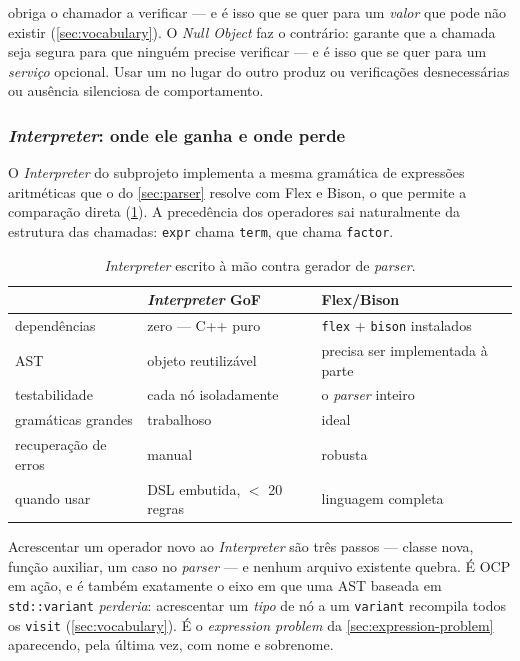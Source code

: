 \begin{regra}
 obriga o chamador a verificar --- e é isso que se quer
para um \emph{valor} que pode não existir (\cref{sec:vocabulary}). O \emph{Null
Object} faz o contrário: garante que a chamada seja segura para que ninguém
precise verificar --- e é isso que se quer para um \emph{serviço} opcional. Usar
um no lugar do outro produz ou verificações desnecessárias ou ausência
silenciosa de comportamento.
\end{regra}

\subsubsection{\emph{Interpreter}: onde ele ganha e onde perde}

O \emph{Interpreter} do subprojeto implementa a mesma gramática de expressões
aritméticas que o  do \cref{sec:parser} resolve com Flex e
Bison, o que permite a comparação direta (\cref{tab:interpreter-bison}). A
precedência dos operadores sai naturalmente da estrutura das chamadas:
\texttt{expr} chama \texttt{term}, que chama \texttt{factor}.

\begin{table}[htbp]
\centering
\caption{\emph{Interpreter} escrito à mão contra gerador de \emph{parser}.}
\label{tab:interpreter-bison}
\footnotesize
\begin{tabular}{@{}lll@{}}
\toprule
 & \textbf{\emph{Interpreter} GoF} & \textbf{Flex/Bison} \\
\midrule
dependências           & zero --- C++ puro      & \texttt{flex} + \texttt{bison} instalados \\
AST                    & objeto reutilizável    & precisa ser implementada à parte \\
testabilidade          & cada nó isoladamente   & o \emph{parser} inteiro \\
gramáticas grandes     & trabalhoso             & ideal \\
recuperação de erros   & manual                 & robusta \\
quando usar            & DSL embutida, $<$ 20 regras & linguagem completa \\
\bottomrule
\end{tabular}
\end{table}

Acrescentar um operador novo ao \emph{Interpreter} são três passos --- classe
nova, função auxiliar, um caso no \emph{parser} --- e nenhum arquivo existente
quebra. É OCP em ação, e é também exatamente o eixo em que uma AST baseada em
\texttt{std::variant} \emph{perderia}: acrescentar um \emph{tipo} de nó a um
\texttt{variant} recompila todos os \texttt{visit} (\cref{sec:vocabulary}). É o
\emph{expression problem} da \cref{sec:expression-problem} aparecendo, pela
última vez, com nome e sobrenome.

